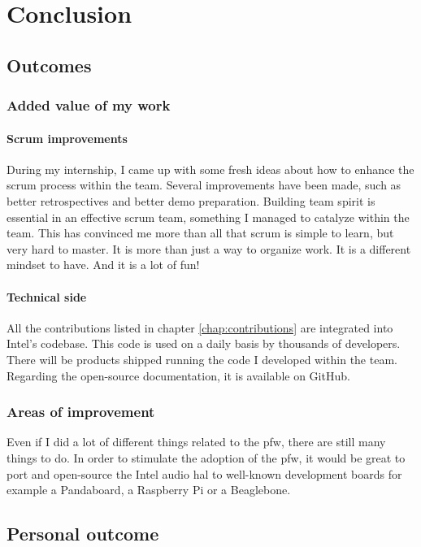 \chapter{Conclusion}

\section{Outcomes}

\subsection{Added value of my work}
\subsubsection{Scrum improvements}
During my internship, I came up with some fresh ideas about how to enhance the \gls{scrum} process within the team.
Several improvements have been made, such as better retrospectives and better demo preparation.
Building team spirit is essential in an effective \gls{scrum} team, something I managed to catalyze within the team.
This has convinced me more than all that \gls{scrum} is simple to learn, but very hard to master.
It is more than just a way to organize work. It is a different mindset to have. And it is a lot of fun!

\subsubsection{Technical side}
All the contributions listed in chapter \ref{chap:contributions} are integrated into Intel's codebase.
This code is used on a daily basis by thousands of developers. There will be products shipped running the
code I developed within the team.
Regarding the open-source documentation, it is available on \gls{GitHub}.

\subsection{Areas of improvement}
Even if I did a lot of different things related to the \gls{pfw}, there are still many things to do.
In order to stimulate the adoption of the \gls{pfw}, it would be great to
port and open-source the Intel audio \gls{hal} to well-known development boards for example a
Pandaboard, a Raspberry Pi or a Beaglebone.


\section{Personal outcome}

